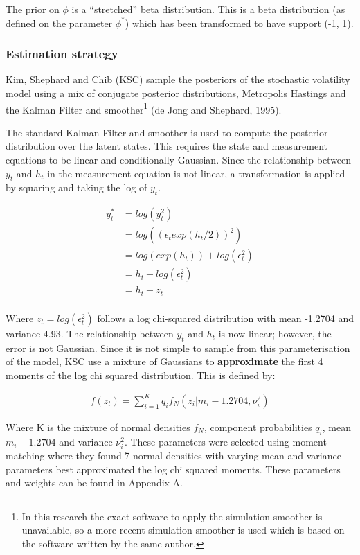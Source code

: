 \documentclass[
  12pt,
  letterpaper,
  DIV=11,
  numbers=noendperiod]{scrartcl}
\begin{document}
The prior on \(\phi\) is a ``stretched'' beta distribution. This is a
beta distribution (as defined on the parameter \(\phi^*\)) which has
been transformed to have support (-1, 1).

\hypertarget{estimation-strategy}{%
\subsubsection{Estimation strategy}\label{estimation-strategy}}

Kim, Shephard and Chib (KSC) sample the posteriors of the stochastic
volatility model using a mix of conjugate posterior distributions,
Metropolis Hastings and the Kalman Filter and smoother\footnote{In this
  research the exact software to apply the simulation smoother is
  unavailable, so a more recent simulation smoother is used which is
  based on the software written by the same author.} (de Jong and
Shephard, 1995).

The standard Kalman Filter and smoother is used to compute the posterior
distribution over the latent states. This requires the state and
measurement equations to be linear and conditionally Gaussian. Since the
relationship between \(y_t\) and \(h_t\) in the measurement equation is
not linear, a transformation is applied by squaring and taking the log
of \(y_t\).

\[
\begin{aligned}
y_t^{*} &= log(y_t^2) \\ 
&= log((\epsilon_t exp(h_t/2))^2) \\
&=  log(exp(h_t)) + log(\epsilon_t^2) \\
&= h_t + log(\epsilon_t^2)  \\
&= h_t + z_t \\
\end{aligned}
\]

Where \(z_t = log(\epsilon_t^2)\) follows a log chi-squared distribution
with mean -1.2704 and variance 4.93. The relationship between \(y_t\)
and \(h_t\) is now linear; however, the error is not Gaussian. Since it
is not simple to sample from this parameterisation of the model, KSC use
a mixture of Gaussians to \textbf{approximate} the first 4 moments of
the log chi squared distribution. This is defined by:

\[
\begin{aligned}
f(z_t) = \sum_{i=1}^{K} q_if_N(z_i|m_i-1.2704, \nu_i^2)
\end{aligned}
\]

Where K is the mixture of normal densities \(f_N\), component
probabilities \(q_i\), mean \(m_i-1.2704\) and variance \(\nu_i^2\).
These parameters were selected using moment matching where they found 7
normal densities with varying mean and variance parameters best
approximated the log chi squared moments. These parameters and weights
can be found in Appendix A.
\end{document}
